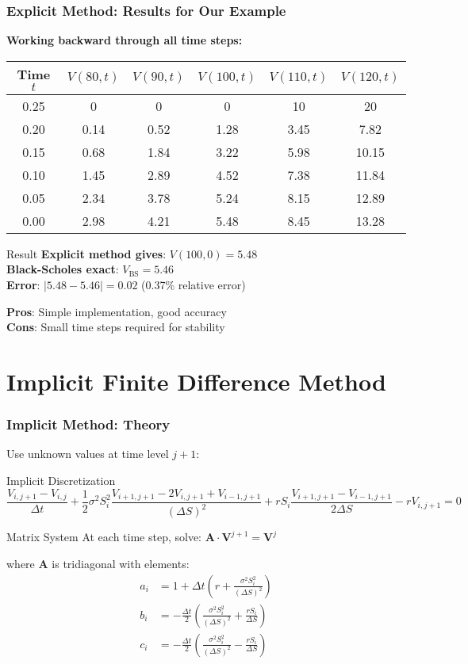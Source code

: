 \documentclass[aspectratio=169]{beamer}
\begin{document}
\begin{frame}
\frametitle{Explicit Method: Results for Our Example}
\textbf{Working backward through all time steps:}

\begin{center}
\begin{tabular}{c|c|c|c|c|c}
Time \(t\) & \(V(80,t)\) & \(V(90,t)\) & \(V(100,t)\) & \(V(110,t)\) & \(V(120,t)\) \\
\hline
0.25 & 0 & 0 & 0 & 10 & 20 \\
0.20 & 0.14 & 0.52 & 1.28 & 3.45 & 7.82 \\
0.15 & 0.68 & 1.84 & 3.22 & 5.98 & 10.15 \\
0.10 & 1.45 & 2.89 & 4.52 & 7.38 & 11.84 \\
0.05 & 2.34 & 3.78 & 5.24 & 8.15 & 12.89 \\
0.00 & 2.98 & 4.21 & 5.48 & 8.45 & 13.28 \\
\end{tabular}
\end{center}

\begin{block}{Result}
\textbf{Explicit method gives}: \(V(100, 0) = 5.48\)\\
\textbf{Black-Scholes exact}: \(V_{\text{BS}} = 5.46\)\\
\textbf{Error}: \(|5.48 - 5.46| = 0.02\) (0.37\% relative error)
\end{block}

\textbf{Pros}: Simple implementation, good accuracy\\
\textbf{Cons}: Small time steps required for stability
\end{frame}

\section{Implicit Finite Difference Method}

\begin{frame}
\frametitle{Implicit Method: Theory}
Use unknown values at time level \(j+1\):

\begin{block}{Implicit Discretization}
\[\frac{V_{i,j+1} - V_{i,j}}{\Delta t} + \frac{1}{2}\sigma^2 S_i^2 \frac{V_{i+1,j+1} - 2V_{i,j+1} + V_{i-1,j+1}}{(\Delta S)^2} + rS_i \frac{V_{i+1,j+1} - V_{i-1,j+1}}{2\Delta S} - rV_{i,j+1} = 0\]
\end{block}

\begin{block}{Matrix System}
At each time step, solve: \(\mathbf{A} \cdot \mathbf{V}^{j+1} = \mathbf{V}^j\)

where \(\mathbf{A}\) is tridiagonal with elements:
\begin{align}
a_i &= 1 + \Delta t \left( r + \frac{\sigma^2 S_i^2}{(\Delta S)^2} \right) \\
b_i &= -\frac{\Delta t}{2} \left( \frac{\sigma^2 S_i^2}{(\Delta S)^2} + \frac{rS_i}{\Delta S} \right) \\
c_i &= -\frac{\Delta t}{2} \left( \frac{\sigma^2 S_i^2}{(\Delta S)^2} - \frac{rS_i}{\Delta S} \right)
\end{align}
\end{block}
\end{frame}
\end{document}
